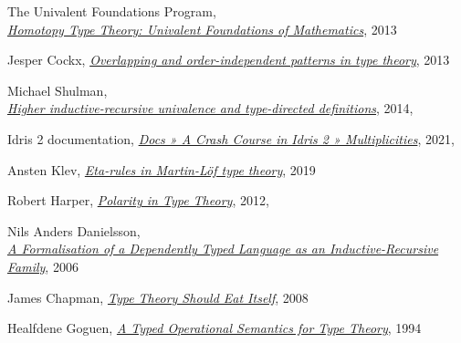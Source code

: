 \documentclass[declaration,mgr,english,shortabstract]{iithesis}
\begin{document}
\begin{thebibliography}{1}
    The Univalent Foundations Program, \\
    \href{https://homotopytypetheory.org/book/}{\textit{Homotopy Type Theory: Univalent Foundations of Mathematics}},
    2013

    Jesper Cockx,
    \href{https://www.scriptiebank.be/sites/default/files/webform/scriptie/masterpaper_5.pdf}{\textit{Overlapping and order-independent patterns in type theory}},
    2013

    Michael Shulman, \\
    \href{https://homotopytypetheory.org/2014/06/08/hiru-tdd/}{\textit{Higher inductive-recursive univalence and type-directed definitions}},
    2014, \\

    Idris 2 documentation,
    \href{https://idris2.readthedocs.io/en/latest/tutorial/multiplicities.html}{\textit{Docs » A Crash Course in Idris 2 » Multiplicities}},
    2021, \\

    Ansten Klev,
    \href{https://philpapers.org/rec/KLEEIM}{\textit{Eta-rules in Martin-L\"{o}f type theory}},
    2019

    Robert Harper,
    \href{https://existentialtype.wordpress.com/2012/08/25/polarity-in-type-theory/}{\textit{Polarity in Type Theory}},
    2012, \\

    Nils Anders Danielsson, \\
    \href{http://www.cse.chalmers.se/~nad/publications/danielsson-types2006.pdf}{\textit{A Formalisation of a Dependently Typed Language as an Inductive-Recursive Family}},
    2006

    James Chapman,
    \href{https://www.sciencedirect.com/science/article/pii/S157106610800577X}{\textit{Type Theory Should Eat Itself}},
    2008

    Healfdene Goguen,
    \href{https://www.lfcs.inf.ed.ac.uk/reports/94/ECS-LFCS-94-304/}{\textit{A Typed Operational Semantics for Type Theory}},
    1994


\end{thebibliography}
\end{document}
